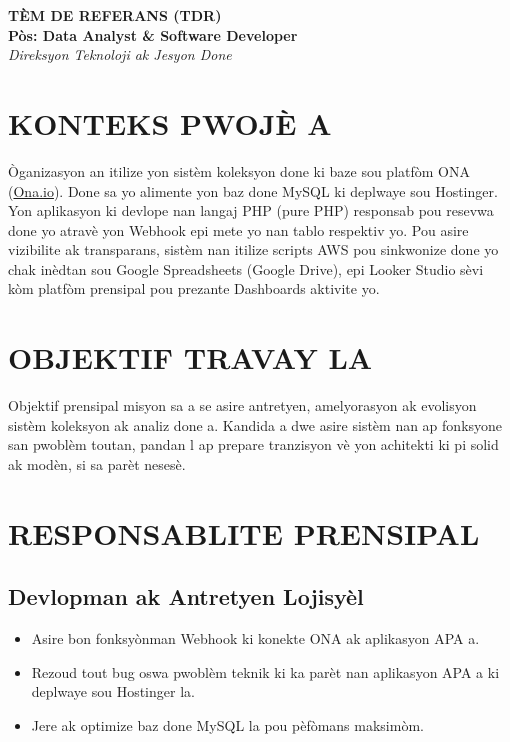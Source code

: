 \documentclass[12pt,a4paper]{article}
\begin{document}
\begin{center}
    {\huge \textbf{TÈM DE REFERANS (TDR)}} \\[0.5cm]
    {\large \textbf{Pòs: Data Analyst \& Software Developer}} \\[0.2cm]
    {\small \textit{Direksyon Teknoloji ak Jesyon Done}}
\end{center}

\vspace{1cm}

\section{KONTEKS PWOJÈ A}
Òganizasyon an itilize yon sistèm koleksyon done ki baze sou platfòm ONA (\url{Ona.io}). Done sa yo alimente yon baz done MySQL ki deplwaye sou Hostinger. Yon aplikasyon ki devlope nan langaj PHP (pure PHP) responsab pou resevwa done yo atravè yon Webhook epi mete yo nan tablo respektiv yo. Pou asire vizibilite ak transparans, sistèm nan itilize scripts AWS pou sinkwonize done yo chak inèdtan sou Google Spreadsheets (Google Drive), epi Looker Studio sèvi kòm platfòm prensipal pou prezante Dashboards aktivite yo.

\section{OBJEKTIF TRAVAY LA}
Objektif prensipal misyon sa a se asire antretyen, amelyorasyon ak evolisyon sistèm koleksyon ak analiz done a. Kandida a dwe asire sistèm nan ap fonksyone san pwoblèm toutan, pandan l ap prepare tranzisyon vè yon achitekti ki pi solid ak modèn, si sa parèt nesesè.

\section{RESPONSABLITE PRENSIPAL}

\subsection{Devlopman ak Antretyen Lojisyèl}
\begin{itemize}
    \item Asire bon fonksyònman Webhook ki konekte ONA ak aplikasyon APA a.
    \item Rezoud tout bug oswa pwoblèm teknik ki ka parèt nan aplikasyon APA a ki deplwaye sou Hostinger la.
    \item Jere ak optimize baz done MySQL la pou pèfòmans maksimòm.
\end{itemize}
\end{document}
